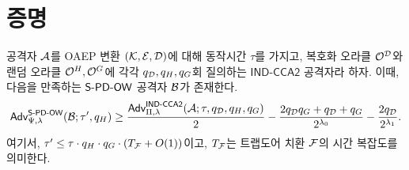 \section{증명}

\begin{tcolorbox}[colback=white]
	\begin{lemma}
		공격자 $\mathcal{A}$를 OAEP 변환 $(\mathcal{K}, \mathcal{E}, \mathcal{D})$에 대해 동작시간 $\tau$를 가지고,
		복호화 오라클 $\mathcal{O}^{\mathcal{D}}$와 랜덤 오라클 $\mathcal{O}^{H}, \mathcal{O}^{G}$에 각각 $q_{\mathcal{D}},
		q_{H}, q_{G}$회 질의하는 $\textsf{IND-CCA2}$ 공격자라 하자. 이때, 다음을
		만족하는 $\textsf{S-PD-OW}$ 공격자 $\mathcal{B}$가 존재한다.
		$$
			\textsf{Adv}^{\textsf{S-PD-OW}}_{\Psi, \lambda}(\mathcal{B}; \tau', q_{H})
		  	\ge \frac{\textsf{Adv}^{\textsf{IND-CCA2}}_{\Pi, \lambda}(\mathcal{A}; \tau, q_{\mathcal{D}}, q_{H}, q_{G})}{2}
		   	- \frac{2q_{\mathcal{D}}q_{G} + q_{\mathcal{D}} + q_{G}}{2^{\lambda_0}}
		   	- \frac{2q_{\mathcal{D}}}{2^{\lambda_1}}.
		$$
	  	여기서, $\tau' \le \tau \cdot q_{H} \cdot q_{G} \cdot (T_{\mathcal{F}} +
	   	O(1))$이고, $T_{\mathcal{F}}$는 트랩도어 치환 $\mathcal{F}$의 시간 복잡도를 의미한다.
	\end{lemma}
\end{tcolorbox}







